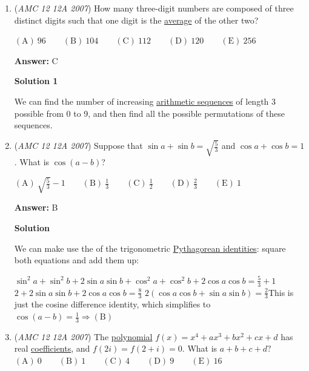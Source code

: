 \begin{enumerate}
 


	\item (\textit{AMC 12 12A 2007}) How many three-digit numbers are composed of three distinct digits such that one digit is the \href{https://artofproblemsolving.com/wiki/index.php?title=Average}{average} of the other two? 


 $\mathrm{(A)}\ 96\qquad \mathrm{(B)}\ 104\qquad \mathrm{(C)}\ 112\qquad \mathrm{(D)}\ 120\qquad \mathrm{(E)}\ 256$

 \textbf{Answer: }C



\textbf{Solution 1}

We can find the number of increasing \href{https://artofproblemsolving.com/wiki/index.php?title=Arithmetic\_sequence}{arithmetic sequences} of length 3 possible from 0 to 9, and then find all the possible permutations of these sequences.

 


	\item (\textit{AMC 12 12A 2007}) Suppose that $\sin a + \sin b = \sqrt{\frac{5}{3}}$ and $\cos a + \cos b = 1$. What is $\cos (a - b)$?


 $\mathrm{(A)}\ \sqrt{\frac{5}{3}} - 1\qquad \mathrm{(B)}\ \frac 13\qquad \mathrm{(C)}\ \frac 12\qquad \mathrm{(D)}\ \frac 23\qquad \mathrm{(E)}\ 1$

 \textbf{Answer: }B



\textbf{Solution}

We can make use the of the trigonometric \href{https://artofproblemsolving.com/wiki/index.php?title=Trigonometric\_identities\#Pythagorean\_Identities}{Pythagorean identities}: square both equations and add them up:

 $\sin^2 a + \sin^2 b + 2\sin a \sin b + \cos^2 a + \cos^2 b + 2\cos a \cos b = \frac{5}{3} + 1$
$2 + 2\sin a \sin b + 2\cos a \cos b = \frac{8}{3}$
$2(\cos a \cos b + \sin a \sin b) = \frac{2}{3}$This is just the cosine difference identity, which simplifies to $\cos (a - b) = \frac{1}{3} \Longrightarrow \mathrm{(B)}$



	\item (\textit{AMC 12 12A 2007}) The \href{https://artofproblemsolving.com/wiki/index.php?title=Polynomial}{polynomial} $f(x) = x^{4} + ax^{3} + bx^{2} + cx + d$ has real \href{https://artofproblemsolving.com/wiki/index.php?title=Coefficient}{coefficients}, and $f(2i) = f(2 + i) = 0.$ What is $a + b + c + d?$
$\mathrm{(A)}\ 0 \qquad \mathrm{(B)}\ 1 \qquad \mathrm{(C)}\ 4 \qquad \mathrm{(D)}\ 9 \qquad \mathrm{(E)}\ 16$


\end{enumerate}
